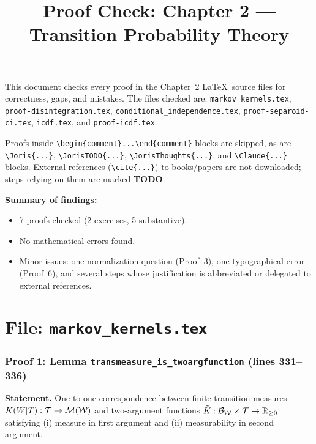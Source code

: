 \documentclass{article}
\title{Proof Check: Chapter 2 --- Transition Probability Theory}
\date{}
\begin{document}
\maketitle

This document checks every proof in the Chapter~2 \LaTeX\ source files for
correctness, gaps, and mistakes.  The files checked are:
\texttt{markov\_kernels.tex},
\texttt{proof-disintegration.tex},
\texttt{conditional\_independence.tex},
\texttt{proof-separoid-ci.tex},
\texttt{icdf.tex}, and
\texttt{proof-icdf.tex}.

Proofs inside \verb|\begin{comment}...\end{comment}| blocks
are skipped, as are
\verb|\Joris{...}|, \verb|\JorisTODO{...}|,
\verb|\JorisThoughts{...}|, and \verb|\Claude{...}| blocks.
External references (\verb|\cite{...}|) to books/papers are not downloaded;
steps relying on them are marked \textbf{TODO}.

\bigskip\noindent
\textbf{Summary of findings:}
\begin{itemize}
  \item 7 proofs checked (2 exercises, 5 substantive).
  \item No mathematical errors found.
  \item Minor issues: one normalization question (Proof~3), one typographical error (Proof~6),
        and several steps whose justification is abbreviated or delegated to external references.
\end{itemize}

\part*{File: \texttt{markov\_kernels.tex}}

\section{Proof 1: Lemma \texttt{transmeasure\_is\_twoargfunction} (lines 331--336)}

\textbf{Statement.} One-to-one correspondence between finite transition measures
$K(W|T): \mathcal{T} \to \mathcal{M}(\mathcal{W})$ and two-argument
functions $\tilde{K}: \mathcal{B}_{\mathcal{W}} \times \mathcal{T} \to \mathbb{R}_{\ge 0}$
satisfying (i) measure in first argument and (ii) measurability in second argument.
\end{document}
